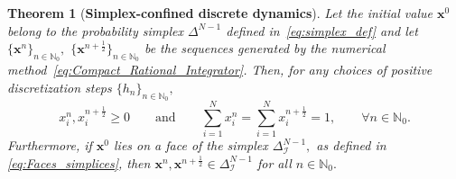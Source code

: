 \documentclass[11pt,letterpaper]{article}
\newtheorem{theorem}{Theorem}[section]
\theoremstyle{remark}
\begin{document}
\begin{theorem}[\textbf{Simplex-confined discrete dynamics}]\label{thm:Preservazione_Simplesso}
    Let the initial value $\bm{x}^0$ belong to the probability simplex $\Delta^{N-1}$ defined in~\eqref{eq:simplex_def} and let $\{\bm{x}^n\}_{n\in \mathbb{N}_0},$ $\{\bm{x}^{n+\frac{1}{2}}\}_{n\in \mathbb{N}_0}$ be the sequences generated by the numerical method~\eqref{eq:Compact_Rational_Integrator}. Then, for any choices of positive discretization steps $\{h_n\}_{n\in \mathbb{N}_0},$
    \begin{equation*}
        x_i^n,x_i^{n+\frac{1}{2}} \geq 0 \qquad \text{and} \qquad \textstyle\sum_{i=1}^{N} x_i^n =\textstyle\sum_{i=1}^{N} x_i^{n+\frac{1}{2}} = 1, \qquad \forall n\in \mathbb{N}_0.
    \end{equation*}
    Furthermore, if $\bm{x}^0$ lies on a face of the simplex $\Delta^{N-1}_\mathcal{I},$ as defined in \eqref{eq:Faces_simplices}, then $\bm{x}^n,\bm{x}^{n+\frac{1}{2}}\in \Delta^{N-1}_\mathcal{I}$ for all $n\in \mathbb{N}_0.$
\end{theorem}
\end{document}
